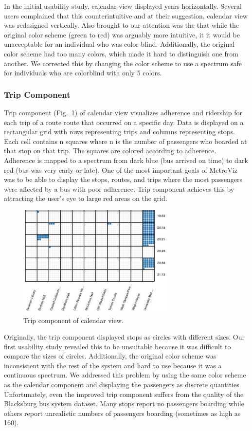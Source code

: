 \documentclass[journal]{vgtc}                %
\begin{document}
In the initial usability study, calendar view displayed years horizontally. Several users complained that this counterintuitive and at their suggestion, calendar view was redesigned vertically. Also brought to our attention was the that while the original color scheme (green to red) was arguably more intuitive, it it would be unacceptable for an individual who was color blind. Additionally, the original color scheme had too many colors, which made it hard to distinguish one from another. We corrected this by changing the color scheme to use a spectrum safe for individuals who are colorblind with only 5 colors.

\subsubsection{Trip Component}
Trip component (Fig.~\ref{trip_component}) of calendar view visualizes adherence and ridership for each trip of a route route that occurred on a specific day. Data is displayed on a rectangular grid with rows representing trips and columns representing stops. Each cell contains n squares where n is the number of passengers who boarded at that stop on that trip. The squares are colored according to adherence. Adherence is mapped to a spectrum from dark blue (bus arrived on time) to dark red (bus was very early or late). One of the most important goals of MetroViz was to be able to display the stops, routes, and trips where the most passengers were affected by a bus with poor adherence. Trip component achieves this by attracting the user's eye to large red areas on the grid.

\begin{figure}[htb]
 \centering
 \includegraphics[width=8cm]{img/image07}
 \caption{Trip component of calendar view.}
 \label{trip_component}
\end{figure}

Originally, the trip component displayed stops as circles with different sizes. Our first usability study revealed this to be unsuitable because it was difficult to compare the sizes of circles. Additionally, the original color scheme was inconsistent with the rest of the system and hard to use because it was a continuous spectrum. We addressed this problem by using the same color scheme as the calendar component and displaying the passengers as discrete quantities. Unfortunately, even the improved trip component suffers from the quality of the Blacksburg bus system dataset. Many stops report no passengers boarding while others report unrealistic numbers of passengers boarding (sometimes as high as 160).
\end{document}
